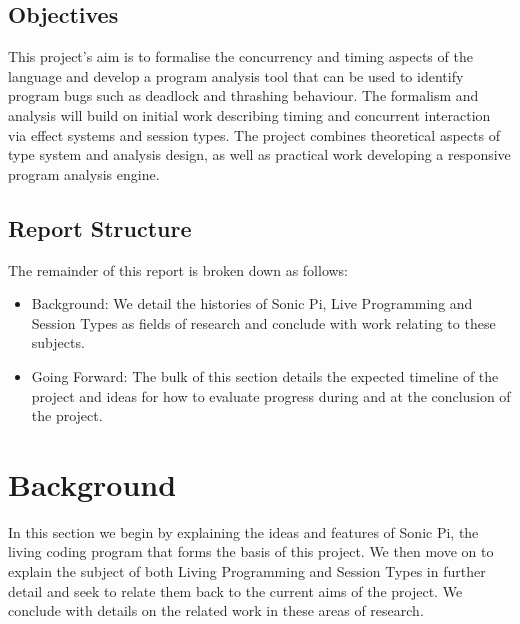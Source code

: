 \documentclass[11pt]{scrartcl}
\begin{document}
\subsection{Objectives}
This project's aim is to formalise the concurrency and timing aspects of the 
language and develop a program analysis tool that can be used to identify 
program bugs such as deadlock and thrashing behaviour. The formalism and 
analysis will build on initial work describing timing and
concurrent interaction via effect systems and session types. The project 
combines theoretical aspects of type system and analysis design, as well as 
practical work developing a responsive program analysis engine.

\subsection{Report Structure}
The remainder of this report is broken down as follows:

\begin{itemize}
	\item Background: We detail the histories of Sonic Pi, Live Programming 
	and Session Types as fields of research and conclude with work relating to
	these subjects.

	\item Going Forward: The bulk of this section details the expected 
	timeline of the project and ideas for how to evaluate progress during and 
	at the conclusion of the project.
\end{itemize}

\section{Background}
In this section we begin by explaining the ideas and features of Sonic Pi, 
the living coding program that forms the basis of this project. We then 
move on to explain the subject of both Living Programming and Session Types
in further detail and seek to relate them back to the current aims of the
project. We conclude with details on the related work in these areas of
research.
\end{document}
